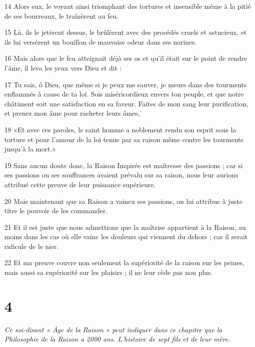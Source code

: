 \par 14 Alors eux, le voyant ainsi triomphant des tortures et insensible même à la pitié de ses bourreaux, le traînèrent au feu.

\par 15 Là, ils le jetèrent dessus, le brûlèrent avec des procédés cruels et astucieux, et ils lui versèrent un bouillon de mauvaise odeur dans ses narines.

\par 16 Mais alors que le feu atteignait déjà ses os et qu'il était sur le point de rendre l'âme, il leva les yeux vers Dieu et dit :

\par 17 Tu sais, ô Dieu, que même si je peux me sauver, je meurs dans des tourments enflammés à cause de ta loi. Sois miséricordieux envers ton peuple, et que notre châtiment soit une satisfaction en sa faveur. Faites de mon sang leur purification, et prenez mon âme pour racheter leurs âmes,'

\par 18 «Et avec ces paroles, le saint homme a noblement rendu son esprit sous la torture et pour l'amour de la loi tenue par sa raison même contre les tourments jusqu'à la mort.»

\par 19 Sans aucun doute donc, la Raison Inspirée est maîtresse des passions ; car si ses passions ou ses souffrances avaient prévalu sur sa raison, nous leur aurions attribué cette preuve de leur puissance supérieure.

\par 20 Mais maintenant que sa Raison a vaincu ses passions, on lui attribue à juste titre le pouvoir de les commander.

\par 21 Et il est juste que nous admettions que la maîtrise appartient à la Raison, au moins dans les cas où elle vainc les douleurs qui viennent du dehors ; car il serait ridicule de le nier.

\par 22 Et ma preuve couvre non seulement la supériorité de la raison sur les peines, mais aussi sa supériorité sur les plaisirs ; il ne leur cède pas non plus.

\chapter{4}

\par \textit{Ce soi-disant « Âge de la Raison » peut indiquer dans ce chapitre que la Philosophie de la Raison a 2000 ans. L'histoire de sept fils et de leur mère.}

